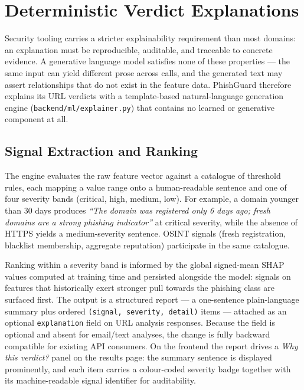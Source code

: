 \section{Deterministic Verdict Explanations}\label{explanation-engine}

Security tooling carries a stricter explainability requirement than most
domains: an explanation must be reproducible, auditable, and traceable to
concrete evidence. A generative language model satisfies none of these
properties --- the same input can yield different prose across calls, and
the generated text may assert relationships that do not exist in the
feature data. PhishGuard therefore explains its URL verdicts with a
template-based natural-language generation engine
(\texttt{backend/ml/explainer.py}) that contains no learned or generative
component at all.

\subsection{Signal Extraction and Ranking}

The engine evaluates the raw feature vector against a catalogue of
threshold rules, each mapping a value range onto a human-readable sentence
and one of four severity bands (critical, high, medium, low). For example,
a domain younger than 30 days produces \emph{``The domain was registered
only 6 days ago; fresh domains are a strong phishing indicator''} at
critical severity, while the absence of HTTPS yields a medium-severity
sentence. OSINT signals (fresh registration, blacklist membership,
aggregate reputation) participate in the same catalogue.

Ranking within a severity band is informed by the global signed-mean SHAP
values computed at training time and persisted alongside the model:
signals on features that historically exert stronger pull towards the
phishing class are surfaced first. The output is a structured report ---
a one-sentence plain-language summary plus ordered
\texttt{(signal,\ severity,\ detail)} items --- attached as an optional
\texttt{explanation} field on URL analysis responses. Because the field is
optional and absent for email/text analyses, the change is fully backward
compatible for existing API consumers. On the frontend the report drives a
\emph{Why this verdict?} panel on the results page: the summary sentence is
displayed prominently, and each item carries a colour-coded severity badge
together with its machine-readable signal identifier for auditability.

